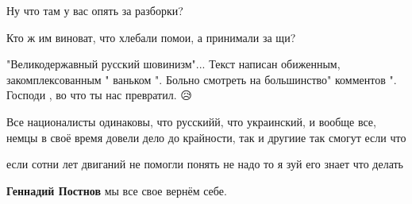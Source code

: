 \begin{itemize}
 
Ну что там у вас опять за разборки?

 
Кто ж им виноват, что хлебали помои, а принимали за щи?

 

"Великодержавный русский шовинизм"... Текст написан обиженным,
закомплексованным " ваньком ". Больно смотреть на большинство" комментов ".
Господи , во что ты нас превратил. 😥


 

Все националисты одинаковы, что русскийй, что украинский, и вообще все, немцы в
своё время довели дело до крайности, так и другиие так смогут если что


 

если сотни лет двиганий не помогли понять не надо то я зуй его знает что делать

\begin{itemize}

 
\textbf{Геннадий Постнов} мы все свое вернём себе.


 

\end{itemize}
\end{itemize}
